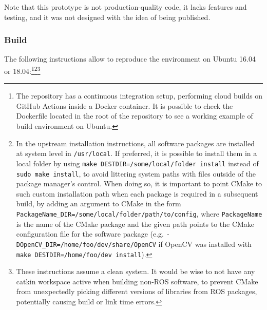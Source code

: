\documentclass[11pt, letterpaper, twoside]{article}
\begin{document}
Note that this prototype is not production-quality code, it lacks features and
testing, and it was not designed with the idea of being published.

\subsubsection{Build}

The following instructions allow to reproduce the environment on Ubuntu 16.04
or 18.04:\footnote{The repository has a continuous integration setup,
performing cloud builds on GitHub Actions inside a Docker container. It is
possible to check the Dockerfile located in the root of the repository to
see a working example of build environment on Ubuntu.}\footnote{In the upstream
installation instructions, all software packages are installed at system level
in \texttt{/usr/local}. If preferred, it is possible to install them in a local
folder by using \texttt{make DESTDIR=/some/local/folder install} instead of
\texttt{sudo make install}, to avoid littering system paths with files outside
of the package manager's control. When doing so, it is important to point CMake
to such custom installation path when each package is required in a subsequent
build, by adding an argument to CMake in the form
\texttt{PackageName\_DIR=/some/local/folder/path/to/config}, where
\texttt{PackageName} is the name of the CMake package and the given path points
to the CMake configuration file for the software package (e.g.
\texttt{-DOpenCV\_DIR=/home/foo/dev/share/OpenCV} if OpenCV was installed with
\texttt{make DESTDIR=/home/foo/dev install}).}\footnote{These
instructions assume a clean system. It would be wise to not have
any catkin workspace active when building non-ROS software, to prevent
CMake from unexpectedly picking different versions of libraries from ROS
packages, potentially causing build or link time errors.}
\end{document}

